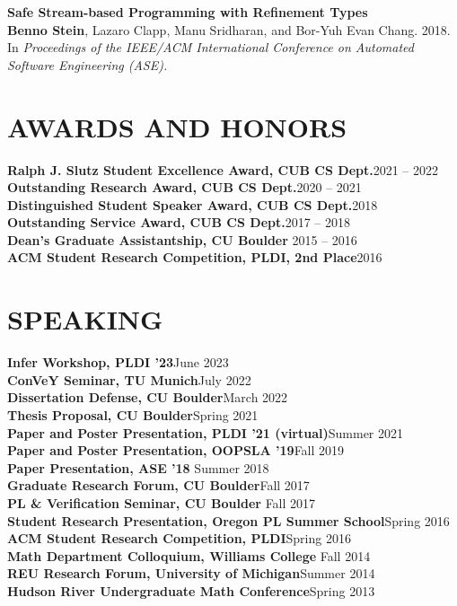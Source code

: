 \documentclass[margin,10pt]{res}
\begin{document}
\begin{resume}
{\bf Safe Stream-based Programming with Refinement Types}\\
{\bf Benno Stein}, Lazaro Clapp, Manu Sridharan, and Bor-Yuh Evan Chang. 2018. In {\em Proceedings of the IEEE/ACM International Conference on Automated Software Engineering (ASE).}

\section{AWARDS AND HONORS}
\begin{spacing}{1.2}
{\bf Ralph J. Slutz Student Excellence Award, CUB CS Dept.}\hfill 2021 -- 2022\\
{\bf Outstanding Research Award, CUB CS Dept.}\hfill 2020 -- 2021\\
{\bf Distinguished Student Speaker Award, CUB CS Dept.}\hfill 2018\\
{\bf Outstanding Service Award, CUB CS Dept.}\hfill 2017 -- 2018\\
{\bf Dean's Graduate Assistantship, CU Boulder} \hfill 2015 -- 2016\\
{\bf ACM Student Research Competition, PLDI, 2nd Place}\hfill 2016
\section{SPEAKING}
{\bf Infer Workshop, PLDI '23}\hfill June 2023\\
{\bf ConVeY Seminar, TU Munich}\hfill July 2022\\
{\bf Dissertation Defense, CU Boulder}\hfill March 2022\\
{\bf Thesis Proposal, CU Boulder}\hfill Spring 2021\\
{\bf Paper and Poster Presentation, PLDI '21 (virtual)}\hfill Summer 2021\\
{\bf Paper and Poster Presentation, OOPSLA '19}\hfill Fall 2019\\
{\bf Paper Presentation, ASE '18 }\hfill Summer 2018\\
{\bf Graduate Research Forum, CU Boulder}\hfill Fall 2017\\
{\bf PL \& Verification Seminar, CU Boulder }\hfill Fall 2017\\
{\bf Student Research Presentation, Oregon PL Summer School}\hfill Spring 2016\\
{\bf ACM Student Research Competition, PLDI}\hfill Spring 2016\\
{\bf Math Department Colloquium, Williams College} \hfill Fall 2014\\
{\bf REU Research Forum, University of Michigan}\hfill Summer 2014\\
{\bf Hudson River Undergraduate Math Conference}\hfill Spring 2013\end{spacing}

\end{resume}
\end{document}
